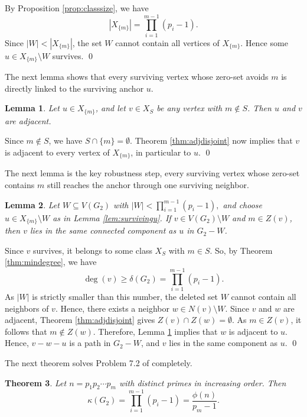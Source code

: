 \documentclass[12pt]{article}
\renewenvironment{proof}{{\bf \noindent Proof.}}{\qed}
\newtheorem{theorem}{Theorem}[section]
\newtheorem{lemma}[theorem]{Lemma}
\theoremstyle{definition}
\begin{document}
	\begin{proof}
		By Proposition \ref{prop:classsize}, we have
		$$
		|X_{\{m\}}|=\prod_{i=1}^{m-1}(p_i-1).
		$$
		Since $|W|<|X_{\{m\}}|$, the set $W$ cannot contain all vertices of $X_{\{m\}}$. Hence some $u\in X_{\{m\}}\setminus W$ survives.
	\end{proof}
	
	\medskip
	 The next lemma shows that every surviving vertex whose zero-set avoids $m$ is directly linked to the surviving anchor $u$.	
	\begin{lemma}\label{lem:directtou}
		Let $u\in X_{\{m\}}$, and let $v\in X_S$ be any vertex with $m\notin S$. Then $u$ and $v$ are adjacent.
	\end{lemma}
	
	\begin{proof}
		Since $m\notin S$, we have $S\cap \{m\}=\emptyset$. Theorem \ref{thm:adjdisjoint} now implies that $v$ is adjacent to every vertex of $X_{\{m\}}$, in particular to $u$.
	\end{proof}
	
	\medskip
	 The next lemma is the key robustness step, every surviving vertex whose zero-set contains $m$ still reaches the anchor through one surviving neighbor.
	\begin{lemma}\label{lem:twostep}
		Let $W\subseteq V(G_2)$ with $ |W|<\prod_{i=1}^{m-1}(p_i-1), $ and choose $u\in X_{\{m\}}\setminus W$ as in Lemma \ref{lem:survivingu}. If $v\in V(G_2)\setminus W$ and $m\in Z(v)$, then $v$ lies in the same connected component as $u$ in $G_2-W$.
	\end{lemma}
	
	\begin{proof}
		Since $v$ survives, it belongs to some class $X_S$ with $m\in S$. So, by Theorem \ref{thm:mindegree}, we have
		$$
		\deg(v)\geq \delta(G_2)=\prod_{i=1}^{m-1}(p_i-1).
		$$
		As $|W|$ is strictly smaller than this number, the deleted set $W$ cannot contain all neighbors of $v$. Hence, there exists a neighbor $ w\in N(v)\setminus W. $ Since $v$ and $w$ are adjacent, Theorem \ref{thm:adjdisjoint} gives
		$ Z(v)\cap Z(w)=\emptyset. $ As $m\in Z(v)$, it follows that $m\notin Z(w)$. Therefore, Lemma \ref{lem:directtou}  implies that $w$ is adjacent to $u$. Hence,  $ v-w-u $ is a path in $G_2-W$, and $v$ lies in the same component as $u$.
	\end{proof}
	
	\medskip
	 The next theorem solves Problem 7.2 of \cite{Banerjee2022} completely. 
	 \begin{theorem}\label{thm:mainconnectivity}
		Let $n=p_1p_2\cdots p_m$ with distinct primes in increasing order. Then
		$$
		\kappa(G_2)=\prod_{i=1}^{m-1}(p_i-1)=\frac{\phi(n)}{p_m-1}.
		$$
	\end{theorem}
	
\end{document}
